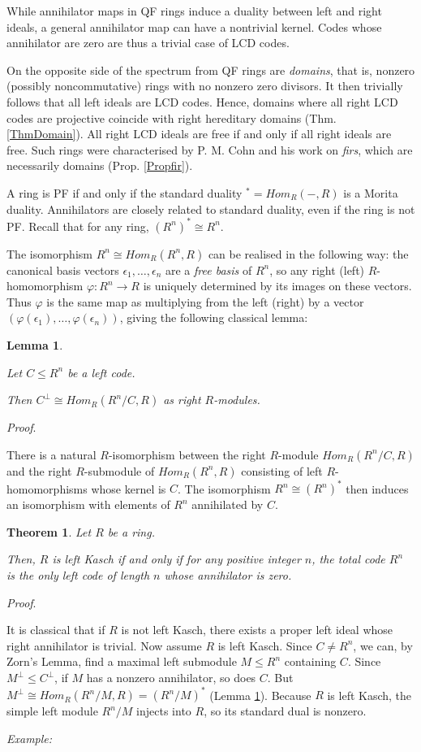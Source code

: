 \documentclass{article}
\theoremstyle{plain}
\newtheorem{Thm}[veta]{Theorem}
\newtheorem{Lemma}[veta]{Lemma}
\theoremstyle{plain}
\theoremstyle{remark}
\theoremstyle{plain}
\newenvironment{dukaz}{
  \par\medskip \noindent
  \textit{Proof}.
}{

\rightline{$\qedsymbol$}
}
\begin{document}
While annihilator maps in QF rings induce a duality between left and right ideals, a general annihilator map can have a nontrivial kernel. Codes whose annihilator are zero are thus a trivial case of LCD codes.  

On the opposite side of the spectrum from QF rings are \textit{domains}, that is, nonzero (possibly noncommutative) rings with no nonzero zero divisors. It then trivially follows that all left ideals are LCD codes. Hence, domains where all right LCD codes are projective coincide with right hereditary domains (Thm. \ref{ThmDomain}). All right LCD ideals are free if and only if all right ideals are free. Such rings were characterised by P. M. Cohn and his work on \textit{firs}, which are necessarily domains (Prop. \ref{Propfir}).


\medskip 
 
 A ring is PF if and only if the standard duality  $^*=Hom_R( -, R)$ is a Morita duality.  Annihilators are closely related to standard duality, even if the ring is not PF.  Recall that for any ring, $(R^n)^*\cong R^n$.

The isomorphism $R^n\cong Hom_R(R^n, R)$ can be realised in the following way: the canonical basis vectors $\epsilon_1, \dots, \epsilon_n$ are a \textit{free basis} of  $R^n$, so any right (left) $R$-homomorphism $\varphi\colon R^n\to R$ is uniquely determined by its images on these vectors. Thus $\varphi$ is the same map as multiplying from the left (right) by a vector $(\varphi(\epsilon_1), \dots, \varphi (\epsilon_n))$, giving the following classical lemma:
\begin{Lemma}\label{Lemmadual}

Let $C\leq R^n$ be a left code. 

Then $C^\perp \cong Hom_R(R^n/C, R)$ as right $R$-modules.    
\end{Lemma}
\begin{dukaz}
   There is a natural $R$-isomorphism between the right $R$-module $Hom_R(R^n/C, R)$ and the right $R$-submodule of $Hom_R(R^n, R)$ consisting of left $R$-homomorphisms whose kernel is $C$.  The isomorphism $R^n\cong (R^n)^*$ then induces an isomorphism with elements of $R^n$ annihilated by $C$.
\end{dukaz}

\begin{Thm}\label{ThmKasch}
    Let $R$ be a ring.

    Then, $R$ is left Kasch if and only if for any positive integer $n$, the total code $R^n$ is the only left code of length $n$ whose annihilator is zero. 
\end{Thm}
\begin{dukaz}
It is classical that if  $R$ is not left Kasch, there exists a proper left ideal whose right annihilator is trivial. Now assume $R$ is left Kasch. Since $C\neq R^n$, we can, by Zorn's Lemma, find a maximal left submodule $M\leq R^n$ containing $C$. Since $M^\perp \leq C^\perp$, if $M$ has a nonzero annihilator, so does $C$. But $M^\perp \cong Hom_R(R^n/M, R)=(R^n/M)^*$ (Lemma \ref{Lemmadual}). Because $R$ is left Kasch, the simple left module $R^n/M$ injects into $R$, so its standard dual is nonzero. 
\end{dukaz}
   \textit{Example:} 
   
\end{document}
